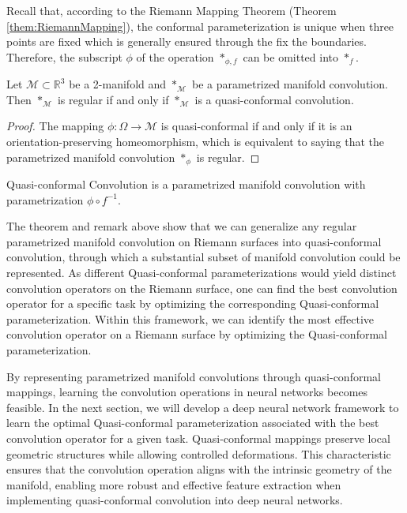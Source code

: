 Recall that, according to the Riemann Mapping Theorem (Theorem \ref{them:RiemannMapping}), the conformal parameterization is unique when three points are fixed which is generally ensured through the fix the boundaries. Therefore, the subscript $\phi$ of the operation $\ast_{\phi, f}$ can be omitted into $\ast_{f}$.

\begin{theorem}
    Let $\mathcal{M} \subset \mathbb{R}^3$ be a 2-manifold and $*_\mathcal{M}$ be a parametrized manifold convolution. Then $*_\mathcal{M}$ is regular if and only if $*_\mathcal{M}$ is a quasi-conformal convolution.
\end{theorem}
\begin{proof}
    The mapping $\phi: \Omega \to \mathcal{M}$ is quasi-conformal if and only if it is an orientation-preserving homeomorphism, which is equivalent to saying that the parametrized manifold convolution $*_\phi$ is regular.
\end{proof}

\begin{remark}
    Quasi-conformal Convolution is a parametrized manifold convolution with parametrization $\phi \circ f^{-1}$.
\end{remark}

The theorem and remark above show that we can generalize any regular parametrized manifold convolution on Riemann surfaces into quasi-conformal convolution, through which a substantial subset of manifold convolution could be represented. As different Quasi-conformal parameterizations would yield distinct convolution operators on the Riemann surface, one can find the best convolution operator for a specific task by optimizing the corresponding Quasi-conformal parameterization. Within this framework, we can identify the most effective convolution operator on a Riemann surface by optimizing the Quasi-conformal parameterization. 

By representing parametrized manifold convolutions through quasi-conformal mappings, learning the convolution operations in neural networks becomes feasible. In the next section, we will develop a deep neural network framework to learn the optimal Quasi-conformal parameterization associated with the best convolution operator for a given task. Quasi-conformal mappings preserve local geometric structures while allowing controlled deformations. This characteristic ensures that the convolution operation aligns with the intrinsic geometry of the manifold, enabling more robust and effective feature extraction when implementing quasi-conformal convolution into deep neural networks.